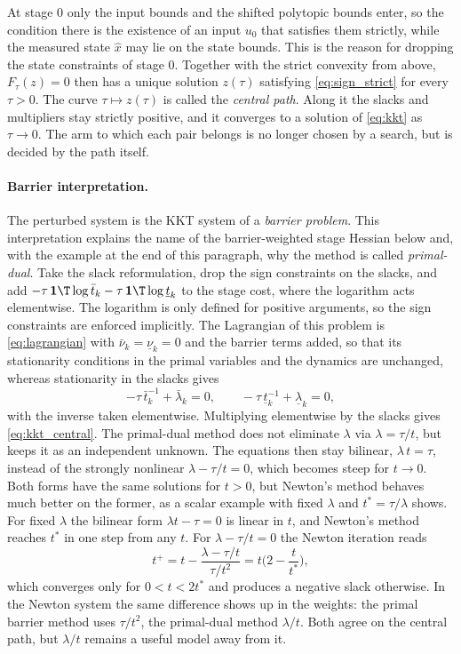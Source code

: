 At stage $0$ only the input bounds and the shifted polytopic bounds enter, so the condition there is the existence of an input $u_0$ that satisfies them strictly, while the measured state $\hat{x}$ may lie on the state bounds.
This is the reason for dropping the state constraints of stage $0$.
Together with the strict convexity from above, $F_\tau(z) = 0$ then has a unique solution $z(\tau)$ satisfying \eqref{eq:sign_strict} for every $\tau > 0$.
The curve $\tau \mapsto z(\tau)$ is called the \textit{central path}.
Along it the slacks and multipliers stay strictly positive, and it converges to a solution of \eqref{eq:kkt} as $\tau \to 0$.
The arm to which each pair belongs is no longer chosen by a search, but is decided by the path itself.

\paragraph{Barrier interpretation.}
The perturbed system is the KKT system of a \textit{barrier problem}.
This interpretation explains the name of the barrier-weighted stage Hessian below and, with the example at the end of this paragraph, why the method is called \textit{primal-dual}.
Take the slack reformulation, drop the sign constraints on the slacks, and add $-\tau\, \mathbf{1}\T\log \bar{t}_k - \tau\, \mathbf{1}\T\log \underline{t}_k$ to the stage cost, where the logarithm acts elementwise.
The logarithm is only defined for positive arguments, so the sign constraints are enforced implicitly.
The Lagrangian of this problem is \eqref{eq:lagrangian} with $\bar{\nu}_k = \underline{\nu}_k = 0$ and the barrier terms added, so that its stationarity conditions in the primal variables and the dynamics are unchanged, whereas stationarity in the slacks gives
\[
    -\tau\, \bar{t}_k^{-1} + \bar{\lambda}_k = 0, \qquad -\tau\, \underline{t}_k^{-1} + \underline{\lambda}_k = 0 ,
\]
with the inverse taken elementwise.
Multiplying elementwise by the slacks gives \eqref{eq:kkt_central}.
The primal-dual method does not eliminate $\lambda$ via $\lambda = \tau / t$, but keeps it as an independent unknown.
The equations then stay bilinear, $\lambda\, t = \tau$, instead of the strongly nonlinear $\lambda - \tau / t = 0$, which becomes steep for $t \to 0$.
Both forms have the same solutions for $t > 0$, but Newton's method behaves much better on the former, as a scalar example with fixed $\lambda$ and $t^* = \tau / \lambda$ shows.
For fixed $\lambda$ the bilinear form $\lambda t - \tau = 0$ is linear in $t$, and Newton's method reaches $t^*$ in one step from any $t$.
For $\lambda - \tau / t = 0$ the Newton iteration reads
\[
    t^+ = t - \frac{\lambda - \tau / t}{\tau / t^2} = t \Big( 2 - \frac{t}{t^*} \Big) ,
\]
which converges only for $0 < t < 2 t^*$ and produces a negative slack otherwise.
In the Newton system the same difference shows up in the weights:
the primal barrier method uses $\tau / t^2$, the primal-dual method $\lambda / t$.
Both agree on the central path, but $\lambda / t$ remains a useful model away from it.

